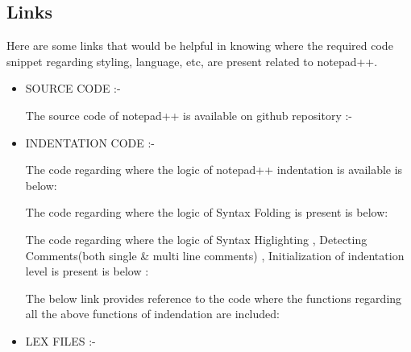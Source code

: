 \subsection{Links}
Here are some links that would be helpful in knowing where the required code snippet
regarding styling, language, etc, are present related to notepad++. \newline
\begin{itemize}
\item SOURCE CODE :-  \newline
\begin{center}
The source code of notepad++ is available on github repository :- 
\end{center}
\item INDENTATION CODE :-  \newline
\begin{center}
The code regarding where the logic of notepad++ indentation is available is below:  
\end{center}
\begin{center}
The code regarding where the logic of Syntax Folding is present is below:  
\end{center}
\begin{center}
The code regarding where the logic of Syntax Higlighting , Detecting
Comments(both single \& multi line comments) , Initialization of indentation level is
present is below :  
\end{center}
\begin{center}
The below link provides reference to the code where the functions regarding all the
above functions of indendation are included:  
\end{center}
\item LEX FILES :-  \newline
\begin{center}

\end{center}
\end{itemize}

